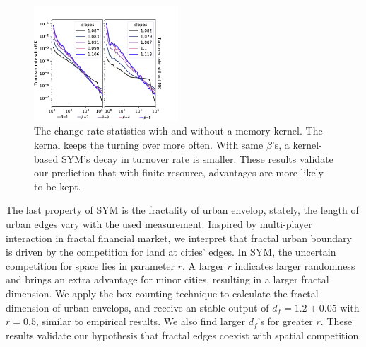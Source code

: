 \documentclass[reprint,unsortedaddress,amsmath,amssymb,aps,prl,showkeys]{revtex4-2}
\begin{document}
\begin{figure}
    \centering
    \includegraphics[width = 0.48\textwidth]{pics/in_one_now-10.pdf}
    \caption{The change rate statistics with and without a memory kernel. The kernal keeps the turning over more often. With same $\beta$'s, a kernel-based SYM's decay in turnover rate is smaller. These results validate our prediction that with finite resource, advantages are more likely to be kept.}
    \label{changerate}
\end{figure}

The last property of SYM is the fractality of urban envelop, stately, the length of urban edges vary with the used measurement. Inspired by multi-player interaction in fractal financial market\cite{PhysRevE.65.037106}, we interpret that fractal urban boundary is driven by the competition for land at cities' edges. In SYM, the uncertain competition for space lies in parameter $r$. A larger $r$ indicates larger randomness and brings an extra advantage for minor cities, resulting in a larger fractal dimension. We apply the box counting technique to calculate the fractal dimension of urban envelops, and receive an stable output of $d_f = 1.2\pm 0.05$ with $r = 0.5$, similar to empirical results\cite{batty1992form}. We also find larger $d_f$'s for greater $r$. These results validate our hypothesis that fractal edges coexist with spatial competition. 

\end{document}
